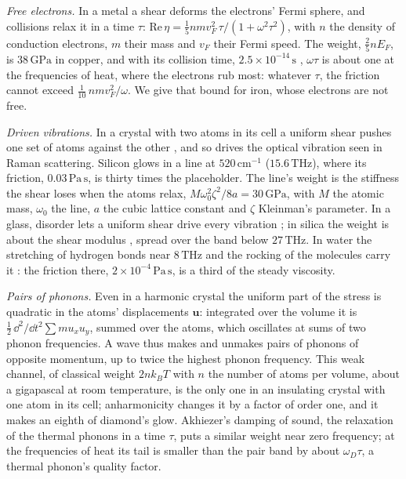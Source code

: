 \emph{Free electrons.} In a metal a shear deforms the electrons' Fermi sphere,
and collisions relax it in a time $\tau$:
$\mathrm{Re}\,\eta = \tfrac15 n m v_F^2\,\tau/(1 + \omega^2\tau^2)$, with $n$ the
density of conduction electrons, $m$ their mass and $v_F$ their Fermi speed. The
weight, $\tfrac25 nE_F$, is $38\,\mathrm{GPa}$ in copper, and with its collision
time, $2.5\times10^{-14}\,\mathrm{s}$ \cite{Hirayama2011}, $\omega\tau$ is about
one at the frequencies of heat, where the electrons rub most: whatever $\tau$,
the friction cannot exceed $\tfrac1{10}\,nmv_F^2/\omega$. We give that bound for
iron, whose electrons are not free.

\emph{Driven vibrations.} In a crystal with two atoms in its cell a uniform
shear pushes one set of atoms against the other \cite{Tanner2021}, and so drives
the optical vibration seen in Raman scattering. Silicon glows in a line at
$520\,\mathrm{cm^{-1}}$ ($15.6\,\mathrm{THz}$), where its friction,
$0.03\,\mathrm{Pa\,s}$, is thirty times the placeholder. The line's weight is the
stiffness the shear loses when the atoms relax, $M\omega_0^2\zeta^2/8a =
30\,\mathrm{GPa}$, with $M$ the atomic mass, $\omega_0$ the line, $a$ the cubic
lattice constant and $\zeta$ Kleinman's parameter. In a glass, disorder lets a
uniform shear drive every vibration \cite{LemaitreMaloney2006,Damart2017}; in
silica the weight is about the shear modulus \cite{Leonforte2006}, spread over
the band below $27\,\mathrm{THz}$. In water the stretching of hydrogen bonds near
$8\,\mathrm{THz}$ and the rocking of the molecules carry it \cite{Schulz2020}:
the friction there, $2\times10^{-4}\,\mathrm{Pa\,s}$, is a third of the steady
viscosity.

\emph{Pairs of phonons.} Even in a harmonic crystal the uniform part of the
stress is quadratic in the atoms' displacements $\mathbf u$: integrated over the
volume it is $\tfrac12\,\dd^2/\dd t^2 \sum m u_x u_y$, summed over the atoms,
which oscillates at sums of two phonon frequencies. A wave thus makes and
unmakes pairs of phonons of opposite momentum, up to twice the highest phonon
frequency. This weak channel, of classical weight $2nk_BT$ with $n$ the number of
atoms per volume, about a gigapascal at room temperature, is the only one in an
insulating crystal with one atom in its cell; anharmonicity changes it by a
factor of order one, and it makes an eighth of diamond's glow. Akhiezer's
damping of sound, the relaxation of the thermal phonons in a time $\tau$, puts a
similar weight near zero frequency; at the frequencies of heat its tail is
smaller than the pair band by about $\omega_D\tau$, a thermal phonon's quality
factor.

